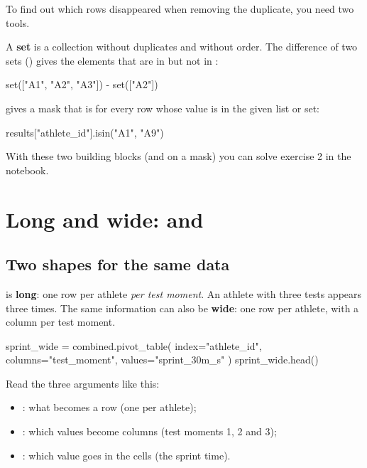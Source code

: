 \documentclass[11pt,a4paper]{article}
\begin{document}
To find out which rows disappeared when removing the duplicate, you need
two tools.

A \textbf{set} is a collection without duplicates and without order. The
difference of two sets () gives the elements that are in
 but not in :

\begin{python}
set(["A1", "A2", "A3"]) - set(["A2"])
\end{python}

 gives a mask that is  for every row whose
value is in the given list or set:

\begin{python}
results["athlete_id"].isin({"A1", "A9"})
\end{python}

With these two building blocks (and  on a mask) you can
solve exercise 2 in the notebook.

\section{Long and wide:  and }

\subsection{Two shapes for the same data}

 is \textbf{long}: one row per athlete \emph{per test
moment}. An athlete with three tests appears three times. The same
information can also be \textbf{wide}: one row per athlete, with a
column per test moment.

\begin{python}
sprint_wide = combined.pivot_table(
    index="athlete_id", columns="test_moment", values="sprint_30m_s"
)
sprint_wide.head()
\end{python}

Read the three arguments like this:
\begin{itemize}
  \item {}: what becomes a row (one per athlete);
  \item {}: which values become columns (test moments 1, 2
        and 3);
  \item {}: which value goes in the cells (the sprint time).
\end{itemize}
\end{document}
